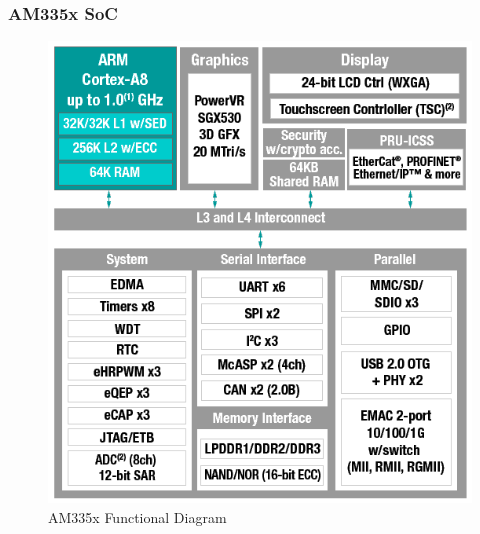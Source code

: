 \begin{frame}
  \frametitle{AM335x SoC}
  \begin{figure}
    \centering
    \includegraphics[scale=0.4]{images/am335x.png}
    \caption{AM335x Functional Diagram}
  \end{figure}
  \vspace*{-12mm} %
\end{frame}

